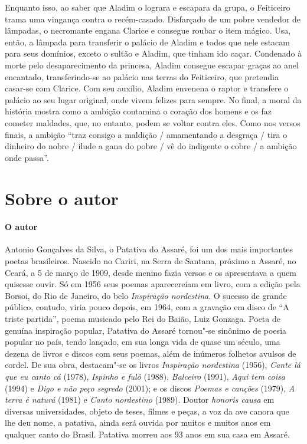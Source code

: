 \documentclass[11pt]{extarticle}
\begin{document}
Enquanto isso, ao saber que Aladim o lograra e escapara da grupa, o Feiticeiro trama uma vingança contra o recém-casado. Disfarçado de um pobre vendedor de lâmpadas, o necromante engana Clarice e consegue roubar o item mágico. Usa, então, a lâmpada para transferir o palácio de Aladim e todos que nele estacam para seus domínios, exceto o sultão e Aladim, que tinham ido caçar. Condenado à morte pelo desaparecimento da princesa, Aladim consegue escapar graças ao anel encantado, transferindo-se ao palácio nas terras do Feiticeiro, que pretendia casar-se com Clarice. Com seu auxílio, Aladim envenena o raptor e transfere o palácio ao seu lugar original, onde vivem felizes para sempre. No final, a moral da história mostra como a ambição contamina o coração dos homens e os faz cometer maldades, que, no entanto, podem se voltar contra eles. Como nos versos finais, a ambição ``traz consigo a maldição / amamentando a desgraça / tira o dinheiro do nobre / ilude a gana do pobre / vê do indigente o cobre / a ambição onde passa''.


\reversemarginpar
\marginparwidth=5cm



\section{Sobre o autor}


\paragraph{O autor}
Antonio Gonçalves da Silva, o Patativa do Assaré, foi um dos mais importantes
poetas brasileiros. Nascido no Cariri, na Serra de Santana, próximo a Assaré,
no Ceará, a 5 de março de 1909, desde menino fazia versos e os apresentava a
quem quisesse ouvir. Só em 1956 seus poemas aparecereiam em livro, com a edição
pela Borsoi, do Rio de Janeiro, do belo \textit{Inspiração nordestina}. O
sucesso de grande público, contudo, viria pouco depois, em 1964, com a gravação
em disco de ``A triste partida'', poema musicado pelo Rei do Baião, Luiz
Gonzaga. Poeta de genuína inspiração popular, Patativa do Assaré tornou"-se
sinônimo de poesia popular no país, tendo lançado, em sua longa vida de quase
um século, uma dezena de livros e discos com seus poemas, além de inúmeros
folhetos avulsos de cordel. De sua obra, destacam"-se os livros
\textit{Inspiração nordestina} (1956), \textit{Cante lá que eu canto cá}
(1978), \textit{Ispinho e fulô} (1988), \textit{Balceiro} (1991), \textit{Aqui
tem coisa} (1994) e \textit{Digo e não peço segredo} (2001); e os discos
\textit{Poemas e canções} (1979), \textit{A terra é naturá} (1981) e
\textit{Canto nordestino} (1989). Doutor \textit{honoris causa} em diversas
universidades, objeto de teses, filmes e peças, a voz da ave canora que lhe deu
nome, a patativa, ainda será ouvida por muitos e muitos anos em qualquer canto
do Brasil. Patativa morreu aos 93 anos em sua casa em Assaré.
\end{document}
